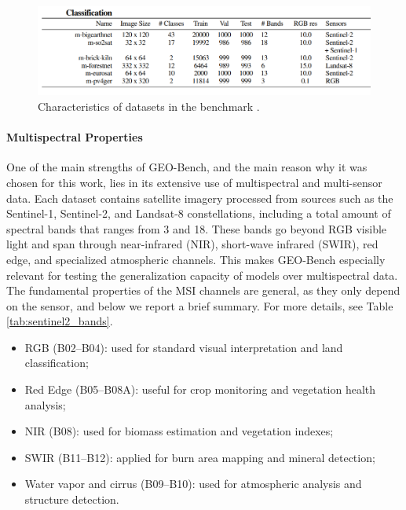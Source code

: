 \documentclass[a4paper, oneside, english]{sapthesis} %
\begin{document}
\begin{figure}[h]
    \centering
    \includegraphics[width=\textwidth]{img/geobench-datasets-classification-info-cut.png}
    \caption{Characteristics of datasets in the benchmark \cite{lacoste2023geo}.}
    \label{fig:geoinfo}
\end{figure}


\vspace{-0.5cm}
\paragraph{Multispectral Properties}

One of the main strengths of GEO-Bench, and the main reason why it was chosen for this work, lies in its extensive use of multispectral and multi-sensor data. Each dataset contains satellite imagery processed from sources such as the Sentinel-1, Sentinel-2, and Landsat-8 constellations, including a total amount of spectral bands that ranges from 3 and 18. These bands go beyond RGB visible light and span through near-infrared (NIR), short-wave infrared (SWIR), red edge, and specialized atmospheric channels. This makes GEO-Bench especially relevant for testing the generalization capacity of models over multispectral data. The fundamental properties of the MSI channels are general, as they only depend on the sensor, and below we report a brief summary. For more details, see Table \ref{tab:sentinel2_bands}.
\begin{itemize}
    \item RGB (B02–B04): used for standard visual interpretation and land classification;
    \item Red Edge (B05–B08A): useful for crop monitoring and vegetation health analysis;
    \item NIR (B08): used for biomass estimation and vegetation indexes;
    \item SWIR (B11–B12): applied for burn area mapping and mineral detection;
    \item Water vapor and cirrus (B09–B10): used for atmospheric analysis and structure detection.
\end{itemize}
\end{document}

